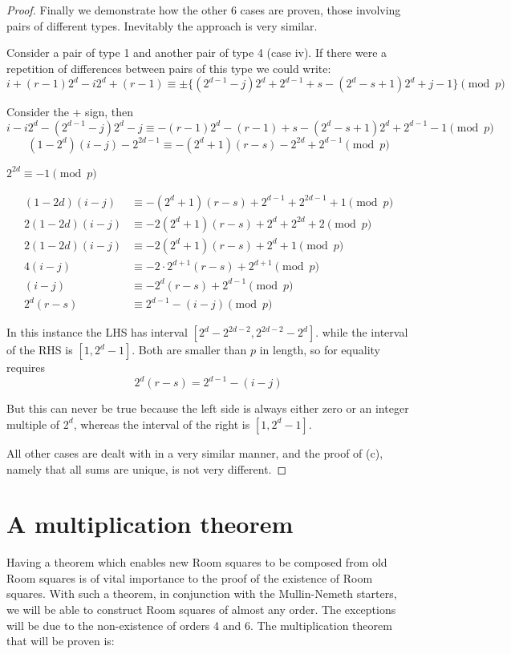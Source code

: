 \documentclass[
  11pt,
  a4paper]{book}
\begin{document}
\begin{proof}
Finally we demonstrate how the other 6 cases are proven,
those involving pairs of different types.  Inevitably the
approach is very similar.

Consider a pair of type 1 and another pair of type 4 (case
iv). If there were a repetition of differences between pairs
of this type we could write:
$$i + (r - 1)2^d - i2^d + (r - 1) \equiv \pm \{(2^{d - 1} - j)2^d + 2^{d - 1} + s - (2^d - s + 1)2^d + j - 1\}\pmod p$$

Consider the + sign,
then
$$i-i2^d-(2^{d-1}-j)2^d-j \equiv -(r-1)2^d-(r-1)+s-(2^d-s+1)2^d+2^{d-1}-1\pmod p$$
$$(1-2^d)(i-j)-2^{2d-1} \equiv -(2^d+1)(r-s)-2^{2d}+2^{d-1}\pmod p$$

$2^{2d} \equiv -1\pmod p$

\begin{align*}
  (1-2d)(i-j) &\equiv -(2^d+1)(r-s)+2^{d-1} + 2^{2d-1} + 1\pmod p \\
  2(1-2d)(i-j) &\equiv -2(2^d+1)(r-s)+2^{d} + 2^{2d} + 2\pmod p \\
  2(1-2d)(i-j) &\equiv -2(2^d+1)(r-s)+2^{d}+1\pmod p \\
  4(i-j) &\equiv -2 \cdot 2^{d+1}(r-s)+2^{d+1}\pmod p \\
  (i-j) &\equiv -2^{d}(r-s)+2^{d-1}\pmod p \\
  2^d(r-s) &\equiv 2^{d-1}-(i-j)\pmod p
\end{align*}

In this instance the LHS has interval
$[2^d - 2^{2d - 2}, 2^{2d - 2} - 2^d]$. while the interval
of the RHS is $[1, 2^d - 1]$. Both are smaller than $p$ in
length, so for equality requires
$$2^d(r  -s) = 2^{d - 1} - (i - j)$$

But this can never be true because the left side is always
either zero or an integer multiple of $2^d$, whereas the
interval of the right is $[1, 2^d - 1]$.

All other cases are dealt with in a very similar manner, and
the proof of (c), namely that all sums are unique, is not
very different.
\end{proof}

\hypertarget{a-multiplication-theorem}{%
\section{A multiplication theorem}\label{a-multiplication-theorem}}

Having a theorem which enables new Room squares to be
composed from old Room squares is of vital importance to the
proof of the existence of Room squares. With such a theorem,
in conjunction with the Mullin-Nemeth starters, we will be
able to construct Room squares of almost any order. The
exceptions will be due to the non-existence of orders 4 and
6. The multiplication theorem that will be proven is:
\end{document}
